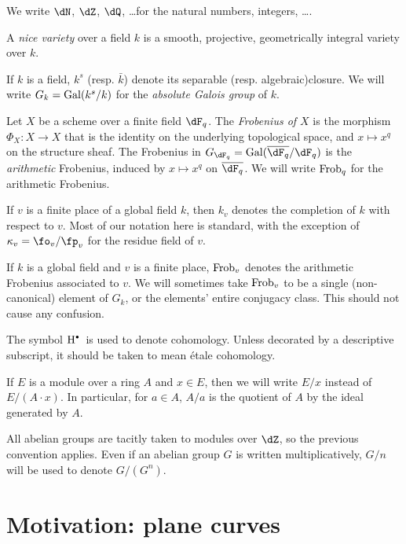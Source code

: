 \documentclass{article}
\begin{document}
We write $\dN$, $\dZ$, $\dQ$, \ldots for the natural numbers, integers, \ldots. 

A \emph{nice variety} over a field $k$ is a smooth, projective, geometrically 
integral variety over $k$. 

If $k$ is a field, $k^s$ (resp. $\bar k$) denote its separable (resp. 
algebraic)closure. We will write $G_k = \operatorname{Gal}(k^s/k)$ for the \emph{absolute 
Galois group} of $k$. 


Let $X$ be a scheme over a finite field $\dF_q$. The \emph{Frobenius of $X$} 
is the morphism $\Phi_X:X\to X$ that is the identity on the underlying 
topological space, and $x\mapsto x^q$ on the structure sheaf. The Frobenius in 
$G_{\dF_q} = \gal(\overline{\dF_q}/\dF_q)$ is the \emph{arithmetic} Frobenius, 
induced by $x\mapsto x^q$ on $\overline{\dF_q}$. We will write $\mathrm{Frob}_q$ for 
the arithmetic Frobenius. 

If $v$ is a finite place of a global field $k$, then $k_v$ denotes the 
completion of $k$ with respect to $v$. Most of our notation here is standard, 
with the exception of $\kappa_v=\fo_v/\fp_v$ for the residue field of $v$. 

If $k$ is a global field and $v$ is a finite place, $\mathrm{Frob}_v$ denotes the 
arithmetic Frobenius associated to $v$. We will sometimes take $\mathrm{Frob}_v$ to be 
a single (non-canonical) element of $G_k$, or the elements' entire conjugacy 
class. This should not cause any confusion. 

The symbol $\h^\bullet{}$ is used to denote cohomology. Unless decorated by a 
descriptive subscript, it should be taken to mean \'etale cohomology. 

If $E$ is a module over a ring $A$ and $x\in E$, then we will write $E/x$ 
instead of $E/(A\cdot x)$. In particular, for $a\in A$, $A/a$ is the quotient 
of $A$ by the ideal generated by $A$. 

All abelian groups are tacitly taken to modules over $\dZ$, so the previous 
convention applies. Even if an abelian group $G$ is written multiplicatively, 
$G/n$ will be used to denote $G/(G^n)$. 










\section*{Motivation: plane curves}
\end{document}
